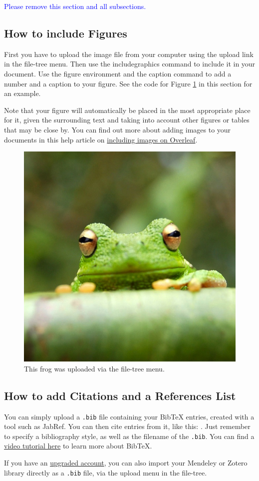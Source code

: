 \documentclass{article}
\begin{document}
\textcolor{blue}{Please remove this section and all subsections.}
\subsection{How to include Figures}

First you have to upload the image file from your computer using the upload link in the file-tree menu. Then use the includegraphics command to include it in your document. Use the figure environment and the caption command to add a number and a caption to your figure. See the code for Figure \ref{fig:frog} in this section for an example.

Note that your figure will automatically be placed in the most appropriate place for it, given the surrounding text and taking into account other figures or tables that may be close by. You can find out more about adding images to your documents in this help article on \href{https://www.overleaf.com/learn/how-to/Including_images_on_Overleaf}{including images on Overleaf}.

\begin{figure}
    \centering
    \includegraphics[width=0.25\linewidth]{Figures/frog.jpg}
    \caption{\label{fig:frog}This frog was uploaded via the file-tree menu.}
\end{figure}


\subsection{How to add Citations and a References List}

You can simply upload a \verb|.bib| file containing your BibTeX entries, created with a tool such as JabRef. You can then cite entries from it, like this: \cite{greenwade93}. Just remember to specify a bibliography style, as well as the filename of the \verb|.bib|. You can find a \href{https://www.overleaf.com/help/97-how-to-include-a-bibliography-using-bibtex}{video tutorial here} to learn more about BibTeX.

If you have an \href{https://www.overleaf.com/user/subscription/plans}{upgraded account}, you can also import your Mendeley or Zotero library directly as a \verb|.bib| file, via the upload menu in the file-tree.




\end{document}

